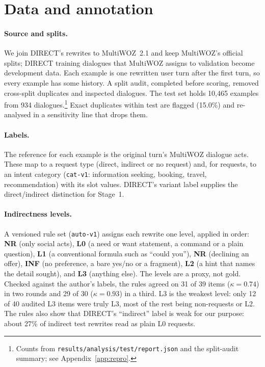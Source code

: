 \documentclass{article}
\begin{document}
\section{Data and annotation}
\label{sec:data}

\paragraph{Source and splits.}
We join DIRECT's rewrites to MultiWOZ~2.1 and keep MultiWOZ's official splits; DIRECT training
dialogues that MultiWOZ assigns to validation become development data. Each example is one
rewritten user turn after the first turn, so every example has some history. A split audit,
completed before scoring, removed cross-split duplicates and inspected dialogues. The test set
holds 10{,}465 examples from 934 dialogues.\footnote{Counts from
\texttt{results/analysis/test/report.json} and the split-audit summary; see
Appendix~\ref{app:repro}.} Exact duplicates within test are flagged (15.0\%) and re-analysed in a
sensitivity line that drops them.

\paragraph{Labels.}
The reference for each example is the original turn's MultiWOZ dialogue acts. These map to a
request type (direct, indirect or no request) and, for requests, to an intent category
(\texttt{cat-v1}: information seeking, booking, travel, recommendation) with its slot values.
DIRECT's variant label supplies the direct/indirect distinction for Stage~1.

\paragraph{Indirectness levels.}
A versioned rule set (\texttt{auto-v1}) assigns each rewrite one level, applied in order:
\textbf{NR} (only social acts), \textbf{L0} (a need or want statement, a command or a plain
question), \textbf{L1} (a conventional formula such as ``could you''), \textbf{NR} (declining an
offer), \textbf{INF} (no preference, a bare yes/no or a fragment), \textbf{L2} (a hint that names
the detail sought), and \textbf{L3} (anything else). The levels are a proxy, not gold. Checked
against the author's labels, the rules agreed on 31 of 39 items ($\kappa=0.74$) in two rounds and
29 of 30 ($\kappa=0.93$) in a third. L3 is the weakest level: only 12 of 40 audited L3 items were
truly L3, most of the rest being non-requests or L2. The rules also show that DIRECT's ``indirect''
label is weak for our purpose: about 27\% of indirect test rewrites read as plain L0 requests.
\end{document}
